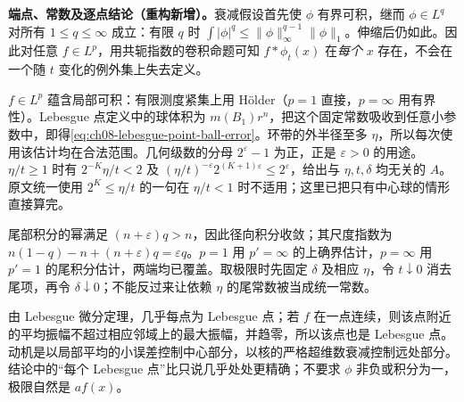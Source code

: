 \documentclass[../../main.tex]{subfiles}
\begin{document}
\begin{remark}
\textbf{端点、常数及逐点结论（重构新增）。}衰减假设首先使 $\phi$ 有界可积，继而 $\phi\in L^q$ 对所有 $1\leqslant q\leqslant\infty$ 成立：有限 $q$ 时 $\int|\phi|^q\leqslant\|\phi\|_\infty^{q-1}\|\phi\|_1$。伸缩后仍如此。因此对任意 $f\in L^p$，用共轭指数的卷积命题可知 $f*\phi_t(x)$ 在\emph{每个} $x$ 存在，不会在一个随 $t$ 变化的例外集上失去定义。

$f\in L^p$ 蕴含局部可积：有限测度紧集上用 Hölder（$p=1$ 直接，$p=\infty$ 用有界性）。Lebesgue 点定义中的球体积为 $m(B_1)r^n$，把这个固定常数吸收到任意小参数中，即得\cref{eq:ch08-lebesgue-point-ball-error}。环带的外半径至多 $\eta$，所以每次使用该估计均在合法范围。几何级数的分母 $2^\varepsilon-1$ 为正，正是 $\varepsilon>0$ 的用途。$\eta/t\geqslant1$ 时有 $2^{-K}\eta/t<2$ 及 $(\eta/t)^{-\varepsilon}2^{(K+1)\varepsilon}\leqslant2^\varepsilon$，给出与 $\eta,t,\delta$ 均无关的 $A$。原文统一使用 $2^K\leqslant\eta/t$ 的一句在 $\eta/t<1$ 时不适用；这里已把只有中心球的情形直接算完。

尾部积分的幂满足 $(n+\varepsilon)q>n$，因此径向积分收敛；其尺度指数为
$n(1-q)-n+(n+\varepsilon)q=\varepsilon q$。$p=1$ 用 $p'=\infty$ 的上确界估计，$p=\infty$ 用 $p'=1$ 的尾积分估计，两端均已覆盖。取极限时先固定 $\delta$ 及相应 $\eta$，令 $t\downarrow0$ 消去尾项，再令 $\delta\downarrow0$；不能反过来让依赖 $\eta$ 的尾常数被当成统一常数。

由 Lebesgue 微分定理，几乎每点为 Lebesgue 点；若 $f$ 在一点连续，则该点附近的平均振幅不超过相应邻域上的最大振幅，并趋零，所以该点也是 Lebesgue 点。动机是以局部平均的小误差控制中心部分，以核的严格超维数衰减控制远处部分。结论中的“每个 Lebesgue 点”比只说几乎处处更精确；不要求 $\phi$ 非负或积分为一，极限自然是 $af(x)$。
\end{remark}

\end{document}
